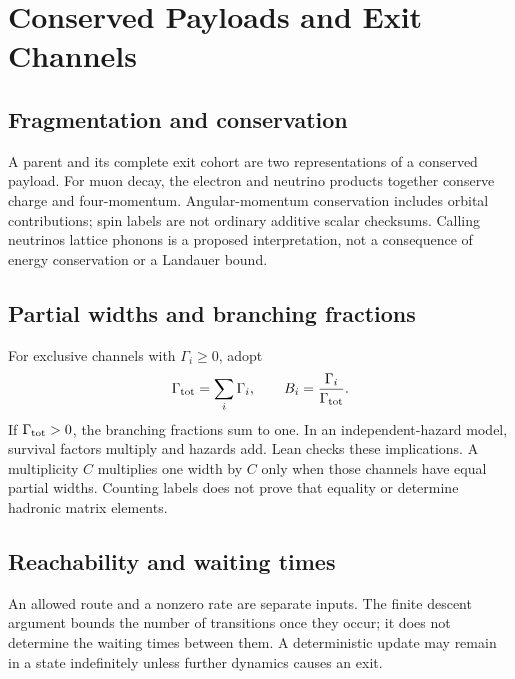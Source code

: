 \section{Conserved Payloads and Exit Channels}
\label{sec:decay_concepts}
\subsection{Fragmentation and conservation}
A parent and its complete exit cohort are two representations of a conserved payload. For muon decay, the electron and neutrino products together conserve charge and four-momentum. Angular-momentum conservation includes orbital contributions; spin labels are not ordinary additive scalar checksums. Calling neutrinos lattice phonons is a proposed interpretation, not a consequence of energy conservation or a Landauer bound.

\subsection{Partial widths and branching fractions}
For exclusive channels with $\Gamma_i\geq0$, adopt
\begin{equation}
\Gamma_{\rm tot}=\sum_i\Gamma_i,\qquad
 B_i=\frac{\Gamma_i}{\Gamma_{\rm tot}}.
\end{equation}
If $\Gamma_{\rm tot}>0$, the branching fractions sum to one. In an independent-hazard model, survival factors multiply and hazards add. Lean checks these implications. A multiplicity $C$ multiplies one width by $C$ only when those channels have equal partial widths. Counting labels does not prove that equality or determine hadronic matrix elements.

\subsection{Reachability and waiting times}
An allowed route and a nonzero rate are separate inputs. The finite descent argument bounds the number of transitions once they occur; it does not determine the waiting times between them. A deterministic update may remain in a state indefinitely unless further dynamics causes an exit.
